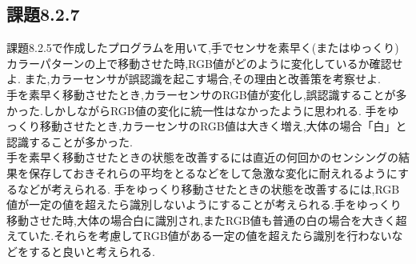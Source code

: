\documentclass{jarticle}
\begin{document}
\subsection{課題8.2.7}
課題8.2.5で作成したプログラムを用いて,手でセンサを素早く(またはゆっくり)カラーパターンの上で移動させた時,RGB値がどのように変化しているか確認せよ. また,カラーセンサが誤認識を起こす場合,その理由と改善策を考察せよ. \\

手を素早く移動させたとき,カラーセンサのRGB値が変化し,誤認識することが多かった.しかしながらRGB値の変化に統一性はなかったように思われる.
手をゆっくり移動させたとき,カラーセンサのRGB値は大きく増え,大体の場合「白」と認識することが多かった. \\
手を素早く移動させたときの状態を改善するには直近の何回かのセンシングの結果を保存しておきそれらの平均をとるなどをして急激な変化に耐えれるようにするなどが考えられる.
手をゆっくり移動させたときの状態を改善するには,RGB値が一定の値を超えたら識別しないようにすることが考えられる.手をゆっくり移動させた時,大体の場合白に識別され,またRGB値も普通の白の場合を大きく超えていた.それらを考慮してRGB値がある一定の値を超えたら識別を行わないなどをすると良いと考えられる.
\end{document}
